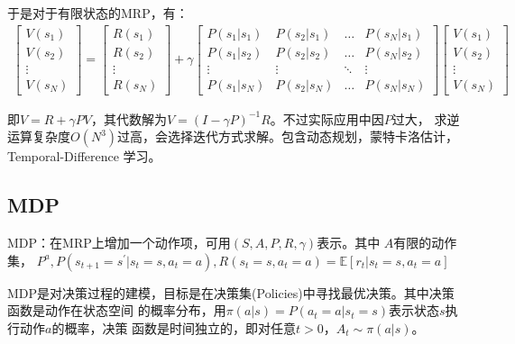 \documentclass[UTF8]{ctexart}
\begin{document}
于是对于有限状态的MRP，有：
$$\begin{array}{c}
    {\left[\begin{array}{c}
    V\left(s_{1}\right) \\
    V\left(s_{2}\right) \\
    \vdots \\
    V\left(s_{N}\right)
    \end{array}\right]=\left[\begin{array}{c}
    R\left(s_{1}\right) \\
    R\left(s_{2}\right) \\
    \vdots \\
    R\left(s_{N}\right)
    \end{array}\right]+\gamma\left[\begin{array}{cccc}
    P\left(s_{1} | s_{1}\right) & P\left(s_{2} | s_{1}\right) & \dots & P\left(s_{N} | s_{1}\right) \\
    P\left(s_{1} | s_{2}\right) & P\left(s_{2} | s_{2}\right) & \dots & P\left(s_{N} | s_{2}\right) \\
    \vdots & \vdots & \ddots & \vdots \\
    P\left(s_{1} | s_{N}\right) & P\left(s_{2} | s_{N}\right) & \dots & P\left(s_{N} | s_{N}\right)
    \end{array}\right]\left[\begin{array}{c}
    V\left(s_{1}\right) \\
    V\left(s_{2}\right) \\
    \vdots \\
    V\left(s_{N}\right)
    \end{array}\right]}
    \end{array}$$

即$V=R+\gamma P V$，其代数解为$V=(I-\gamma P)^{-1} R$。不过实际应用中因$P$过大，
求逆运算复杂度$O\left(N^{3}\right)$过高，会选择迭代方式求解。包含动态规划，蒙特卡洛估计，
Temporal-Difference 学习。

\subsection{MDP}
MDP：在MRP上增加一个动作项，可用$(S, A, P, R, \gamma)$表示。其中
$A$有限的动作集，
$P^{a}, P\left(s_{t+1}=s^{\prime} | s_{t}=s, a_{t}=a\right), 
R\left(s_{t}=s, a_{t}=a\right)=\mathbb{E}\left[r_{t} | s_{t}=s, a_{t}=a\right]$

MDP是对决策过程的建模，目标是在决策集(Policies)中寻找最优决策。其中决策函数是动作在状态空间
的概率分布，用$\pi(a | s)=P\left(a_{t}=a | s_{t}=s\right)$表示状态$s$执行动作$a$的概率，决策
函数是时间独立的，即对任意$t>0$，$A_{t} \sim \pi(a | s)$。
\end{document}
